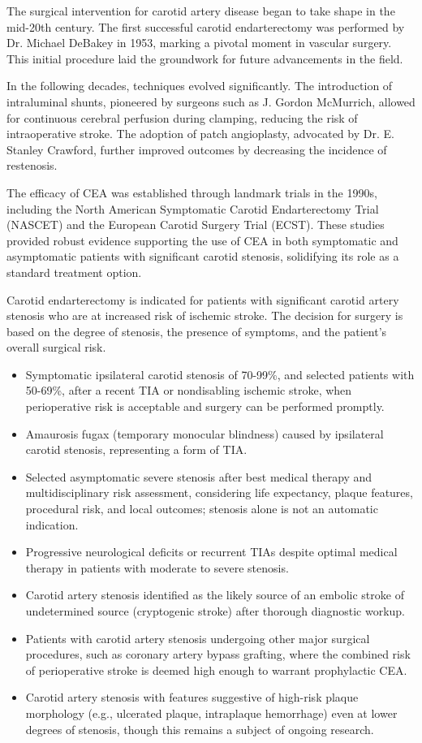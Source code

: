 The surgical intervention for carotid artery disease began to take shape in the mid-20th century. The first successful carotid endarterectomy was performed by Dr. Michael DeBakey in 1953, marking a pivotal moment in vascular surgery. This initial procedure laid the groundwork for future advancements in the field.

In the following decades, techniques evolved significantly. The introduction of intraluminal shunts, pioneered by surgeons such as J. Gordon McMurrich, allowed for continuous cerebral perfusion during clamping, reducing the risk of intraoperative stroke. The adoption of patch angioplasty, advocated by Dr. E. Stanley Crawford, further improved outcomes by decreasing the incidence of restenosis.

The efficacy of CEA was established through landmark trials in the 1990s, including the North American Symptomatic Carotid Endarterectomy Trial (NASCET) and the European Carotid Surgery Trial (ECST). These studies provided robust evidence supporting the use of CEA in both symptomatic and asymptomatic patients with significant carotid stenosis, solidifying its role as a standard treatment option.

Carotid endarterectomy is indicated for patients with significant carotid artery stenosis who are at increased risk of ischemic stroke. The decision for surgery is based on the degree of stenosis, the presence of symptoms, and the patient's overall surgical risk.

\begin{itemize}
  \item Symptomatic ipsilateral carotid stenosis of 70-99\%, and selected patients with 50-69\%, after a recent TIA or nondisabling ischemic stroke, when perioperative risk is acceptable and surgery can be performed promptly.
  \item Amaurosis fugax (temporary monocular blindness) caused by ipsilateral carotid stenosis, representing a form of TIA.
  \item Selected asymptomatic severe stenosis after best medical therapy and multidisciplinary risk assessment, considering life expectancy, plaque features, procedural risk, and local outcomes; stenosis alone is not an automatic indication.
  \item Progressive neurological deficits or recurrent TIAs despite optimal medical therapy in patients with moderate to severe stenosis.
  \item Carotid artery stenosis identified as the likely source of an embolic stroke of undetermined source (cryptogenic stroke) after thorough diagnostic workup.
  \item Patients with carotid artery stenosis undergoing other major surgical procedures, such as coronary artery bypass grafting, where the combined risk of perioperative stroke is deemed high enough to warrant prophylactic CEA.
  \item Carotid artery stenosis with features suggestive of high-risk plaque morphology (e.g., ulcerated plaque, intraplaque hemorrhage) even at lower degrees of stenosis, though this remains a subject of ongoing research.
\end{itemize}

